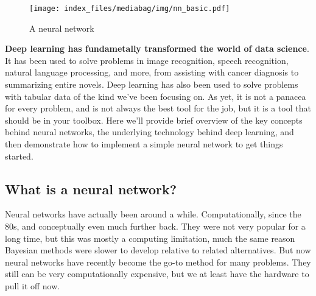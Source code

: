 \documentclass[
  letterpaper,
]{krantz}
\begin{document}
\begin{figure}

{\centering \texttt{[image: index\_files/mediabag/img/nn\_basic.pdf]}

}

\caption{A neural network}

\end{figure}

\textbf{Deep learning has fundametally transformed the world of data
science}. It has been used to solve problems in image recognition,
speech recognition, natural language processing, and more, from
assisting with cancer diagnosis to summarizing entire novels. Deep
learning has also been used to solve problems with tabular data of the
kind we've been focusing on. As yet, it is not a panacea for every
problem, and is not always the best tool for the job, but it is a tool
that should be in your toolbox. Here we'll provide brief overview of the
key concepts behind neural networks, the underlying technology behind
deep learning, and then demonstrate how to implement a simple neural
network to get things started.

\subsection{What is a neural network?}\label{sec-ml-nnet}

Neural networks have actually been around a while. Computationally,
since the 80s, and conceptually even much further back. They were not
very popular for a long time, but this was mostly a computing
limitation, much the same reason Bayesian methods were slower to develop
relative to related alternatives. But now neural networks have recently
become the go-to method for many problems. They still can be very
computationally expensive, but we at least have the hardware to pull it
off now.
\end{document}
